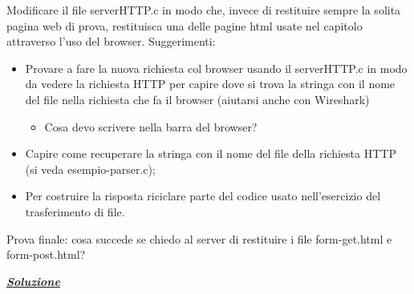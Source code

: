 \documentclass[a4paper]{article}
\begin{document}
	Modificare il file \textsf{serverHTTP.c} in modo che, invece di restituire sempre la solita pagina web di prova, restituisca una delle pagine html usate nel capitolo attraverso l'uso del browser. Suggerimenti:
	\begin{itemize}
		\item Provare a fare la nuova richiesta col browser usando il \textsf{serverHTTP.c} in modo da vedere la richiesta HTTP per capire dove si trova la stringa con il nome del file nella richiesta che fa il browser (aiutarsi anche con Wireshark)
		\begin{itemize}
			\item Cosa devo scrivere nella barra del browser?
		\end{itemize}
		
		\item Capire come recuperare la stringa con il nome del file della richiesta HTTP (si veda \textsf{esempio-parser.c});
		
		\item Per costruire la risposta riciclare parte del codice usato nell'esercizio del trasferimento di file.
	\end{itemize}
	Prova finale: cosa succede se chiedo al server di restituire i file \textsf{form-get.html} e \textsf{form-post.html}?\newline
	
	\noindent
	\textcolor{Green4}{\underline{\textbf{\emph{Soluzione}}}}\newline
	
\end{document}
